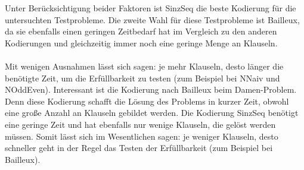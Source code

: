\documentclass[a4,abstract=on]{scrartcl}
\begin{document}
Unter Berücksichtigung beider Faktoren ist SinzSeq die beste Kodierung für die untersuchten Testprobleme. Die zweite Wahl für diese Testprobleme ist Bailleux, da sie ebenfalls einen geringen Zeitbedarf hat im Vergleich zu den anderen Kodierungen und gleichzeitig immer noch eine geringe Menge an Klauseln.\\
\ \\
Mit wenigen Ausnahmen lässt sich sagen: je mehr Klauseln, desto länger die benötigte Zeit, um die Erfüllbarkeit zu testen (zum Beispiel bei NNaiv und NOddEven). Interessant ist die Kodierung nach Bailleux beim Damen-Problem. Denn diese Kodierung schafft die Lösung des Problems in kurzer Zeit, obwohl eine große Anzahl an Klauseln gebildet werden. Die Kodierung SinzSeq benötigt eine geringe Zeit und hat ebenfalls nur wenige Klauseln, die gelöst werden müssen. Somit lässt sich im Wesentlichen sagen: je weniger Klauseln, desto schneller geht in der Regel das Testen der Erfüllbarkeit (zum Beispiel bei Bailleux). 
\end{document}
